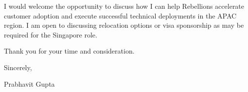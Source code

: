 \documentclass[11pt,a4paper]{article}
\begin{document}
\noindent I would welcome the opportunity to discuss how I can help Rebellions accelerate customer adoption and execute successful technical deployments in the APAC region. I am open to discussing relocation options or visa sponsorship as may be required for the Singapore role. 

\noindent Thank you for your time and consideration.

\vspace{1em}

\noindent Sincerely,

\vspace{2em}

\noindent Prabhavit Gupta
\end{document}
